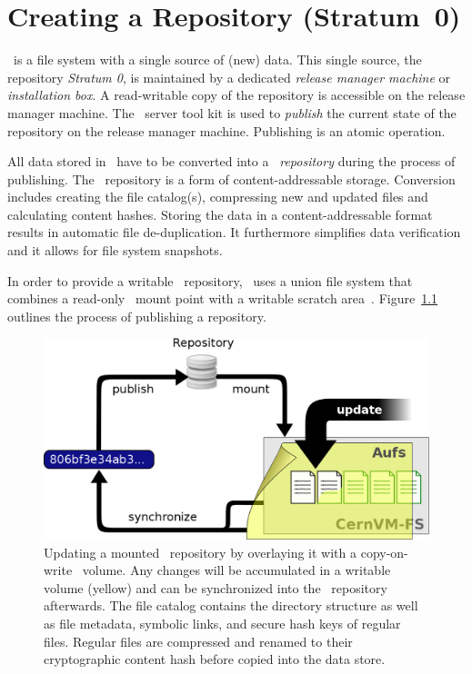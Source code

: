 \chapter{Creating a Repository (Stratum~0)}
\label{sct:createrepo}


\cvmfs\ is a file system with a single source of (new) data.
This single source, the repository \emph{Stratum 0}, is maintained by a dedicated \emph{release manager machine} or \emph{installation box}.
A read-writable copy of the repository is accessible on the release manager machine.
The \cvmfs\ server tool kit is used to \emph{publish} the current state of the repository on the release manager machine.
Publishing is an atomic operation.

All data stored in \cvmfs\ have to be converted into a \cvmfs\ \emph{repository} during the process of publishing.
The \cvmfs\ repository is a form of content-addressable storage.
Conversion includes creating the file catalog(s), compressing new and updated files and calculating content hashes.
Storing the data in a content-addressable format results in automatic file de-duplication.
It furthermore simplifies data verification and it allows for file system snapshots.

In order to provide a writable \cvmfs\ repository, \cvmfs\ uses a union file system that combines a read-only \cvmfs\ mount point with a writable scratch area~\cite{unionfs04,aufs}.
Figure~\ref{fig:installwebserver} outlines the process of publishing a repository.

\begin{figure}[h]
	\includegraphics[width=\textwidth]{figures/update_process.png}
	\caption{Updating a mounted \cvmfs\ repository by overlaying it with a copy-on-write \aufs\ volume. 
		Any changes will be accumulated in a writable volume (yellow) and can be synchronized into the \cvmfs\ repository afterwards. 
		The file catalog contains the directory structure as well as file metadata, symbolic links, and secure hash keys of regular files. 
		Regular files are compressed and renamed to their cryptographic content hash before copied into the data store.}
	\label{fig:installwebserver}
\end{figure}


